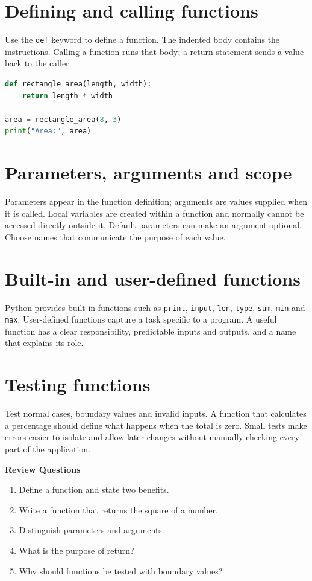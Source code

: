 \documentclass[11pt,openany,oneside]{book}
\newcommand{\reviewtitle}{\par\noindent\textbf{\color{Navy}Review Questions}\par}
\begin{document}
\section{Defining and calling functions}
Use the \texttt{def} keyword to define a function. The indented body contains the instructions. Calling a function runs that body; a return statement sends a value back to the caller.

\begin{lstlisting}[style=webcode,language=Python]
def rectangle_area(length, width):
    return length * width

area = rectangle_area(8, 3)
print("Area:", area)
\end{lstlisting}

\section{Parameters, arguments and scope}
Parameters appear in the function definition; arguments are values supplied when it is called. Local variables are created within a function and normally cannot be accessed directly outside it. Default parameters can make an argument optional. Choose names that communicate the purpose of each value.

\section{Built-in and user-defined functions}
Python provides built-in functions such as \texttt{print}, \texttt{input}, \texttt{len}, \texttt{type}, \texttt{sum}, \texttt{min} and \texttt{max}. User-defined functions capture a task specific to a program. A useful function has a clear responsibility, predictable inputs and outputs, and a name that explains its role.

\section{Testing functions}
Test normal cases, boundary values and invalid inputs. A function that calculates a percentage should define what happens when the total is zero. Small tests make errors easier to isolate and allow later changes without manually checking every part of the application.

\reviewtitle
\begin{enumerate}
\item Define a function and state two benefits.
\item Write a function that returns the square of a number.
\item Distinguish parameters and arguments.
\item What is the purpose of return?
\item Why should functions be tested with boundary values?
\end{enumerate}
\end{document}
